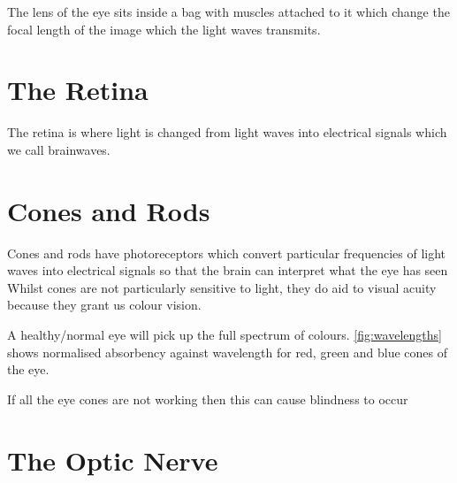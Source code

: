The lens of the eye sits inside a bag with muscles attached to it which change
the focal length of the image which the light waves transmits.

\section{The Retina}
The retina is where light is changed from light waves into electrical signals
which we call brainwaves.

\section{Cones and Rods}

Cones and rods have photoreceptors which convert particular frequencies of light
waves into electrical signals so that the brain can interpret what the eye has seen Whilst cones are not particularly sensitive to light, they do aid to visual
acuity because they grant us colour vision.\cite{}

A healthy/normal eye will pick up the full spectrum of colours.
\ref{fig:wavelengths} shows normalised absorbency against wavelength for red,
green and blue cones of the eye.

If all the eye cones are not working then this can cause
blindness to occur\cite{}

\section{The Optic Nerve}
